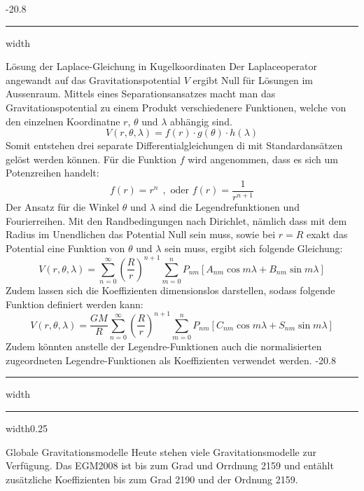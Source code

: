 \documentclass[9pt, landscape, fleqn]{scrartcl}
\makeatletter
\renewcommand{\subsection}{\@startsection{subsection}{1}{0mm}%
{-2\baselineskip}{0.8\baselineskip}%
{\hrule depth 0.2pt width\columnwidth\hrule depth0.75pt
width0.25\columnwidth\vspace*{1.2em}\large\bfseries\rmfamily}}
\renewcommand{\subsubsection}{\@startsection{subsubsection}{1}{0mm}%
{-2\baselineskip}{0.8\baselineskip}%
{\hrule depth 0.2pt width\columnwidth\vspace*{1.2em}\normalsize\bfseries\rmfamily}}
\makeatother
\begin{document}
\begin{multicols*}{3}
\subsubsection{Lösung der Laplace-Gleichung in Kugelkoordinaten}
Der Laplaceoperator angewandt auf das Gravitationspotential $V$ ergibt Null für Lösungen im Aussenraum. Mittels eines Separationsansatzes macht man das Gravitationspotential zu einem Produkt verschiedenere Funktionen, welche von den einzelnen Koordinatne $r$, $\theta$ und $\lambda$ abhängig sind.
\begin{equation*}
    V(r,\theta, \lambda) = f(r) \cdot g(\theta) \cdot h(\lambda)
\end{equation*}
Somit entstehen drei separate Differentialgleichungen di mit Standardansätzen gelöst werden können. Für die Funktion $f$ wird angenommen, dass es sich um Potenzreihen handelt:
\begin{equation*}
    f(r) = r^n~~, \text{ oder } f(r) = \frac{1}{r^{n+1}}
\end{equation*}
Der Ansatz für die Winkel $\theta$ und $\lambda$ sind die Legendrefunktionen und Fourierreihen. Mit den Randbedingungen nach Dirichlet, nämlich dass mit dem Radius im Unendlichen das Potential Null sein muss, sowie bei $r=R$ exakt das Potential eine Funktion von $\theta$ und $\lambda$ sein muss, ergibt sich folgende Gleichung:
\begin{equation*}
    V(r,\theta, \lambda) = \sum_{n=0}^{\infty} \left( \frac{R}{r}\right)^{n+1} \sum_{m=0}^{n} P_{nm}\left[ A_{nm} \cos m \lambda + B_{nm} \sin m\lambda \right]
\end{equation*}
Zudem lassen sich die Koeffizienten dimensionslos darstellen, sodass folgende Funktion definiert werden kann:
\begin{equation*}
    V(r,\theta, \lambda) = \frac{GM}{R}\sum_{n=0}^{\infty} \left( \frac{R}{r}\right)^{n+1} \sum_{m=0}^{n} P_{nm}\left[ C_{nm} \cos m \lambda + S_{nm} \sin m\lambda \right]
\end{equation*}
Zudem könnten anstelle der Legendre-Funktionen auch die normalisierten zugeordneten Legendre-Funktionen als Koeffizienten verwendet werden.
\subsection{Globale Gravitationsmodelle}
Heute stehen viele Gravitationsmodelle zur Verfügung. Das EGM2008 ist bis zum Grad und Orrdnung 2159 und entählt zusätzliche Koeffizienten bis zum Grad 2190 und der Ordnung 2159. \\


\end{multicols*}
\end{document}

